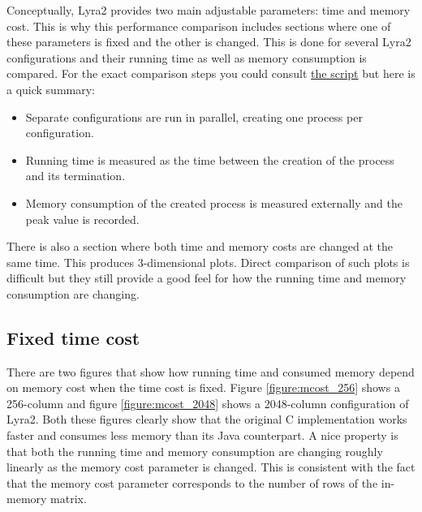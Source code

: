 Conceptually, Lyra2 provides two main adjustable parameters: time and memory cost. This is why this performance comparison includes sections where one of these parameters is fixed and the other is changed. This is done for several Lyra2 configurations and their running time as well as memory consumption is compared. For the exact comparison steps you could consult \href{https://github.com/all3fox/lyra2-compare/blob/master/src/compare.ipynb}{the script} but here is a quick summary:

\begin{itemize}
\item Separate configurations are run in parallel, creating one process per configuration.
\item Running time is measured as the time between the creation of the process and its termination.
\item Memory consumption of the created process is measured externally and the peak value is recorded.
\end{itemize}

There is also a section where both time and memory costs are changed at the same time. This produces 3-dimensional plots. Direct comparison of such plots is difficult but they still provide a good feel for how the running time and memory consumption are changing.

\subsection{Fixed time cost}

There are two figures that show how running time and consumed memory depend on memory cost when the time cost is fixed. Figure \ref{figure:mcost_256} shows a 256-column and figure \ref{figure:mcost_2048} shows a 2048-column configuration of Lyra2. Both these figures clearly show that the original C implementation works faster and consumes less memory than its Java counterpart. A nice property is that both the running time and memory consumption are changing roughly linearly as the memory cost parameter is changed. This is consistent with the fact that the memory cost parameter corresponds to the number of rows of the in-memory matrix.

